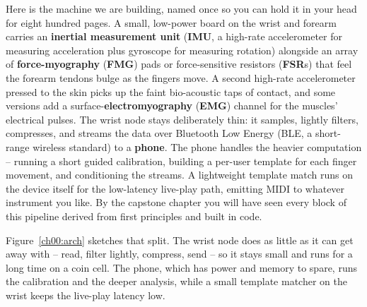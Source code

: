 \begin{goalbox}
Here is the machine we are building, named once so you can hold it in your head for eight
hundred pages. A small, low-power board on the wrist and forearm carries an \textbf{inertial measurement unit} (\textbf{IMU}, a
high-rate accelerometer for measuring acceleration plus gyroscope for measuring rotation) alongside an array of \textbf{force-myography} (\textbf{FMG}) pads or
force-sensitive resistors (\textbf{FSR}s) that feel the forearm tendons bulge as the fingers move. A
second high-rate accelerometer pressed to the skin picks up the faint bio-acoustic taps of
contact, and some versions add a surface-\textbf{electromyography} (\textbf{EMG}) channel for the muscles' electrical pulses.
The wrist node stays deliberately thin: it samples, lightly filters, compresses, and streams
the data over Bluetooth Low Energy (BLE, a short-range wireless standard) to a \textbf{phone}. The phone handles the heavier computation -- running a
short guided calibration, building a per-user template for each finger movement, and
conditioning the streams. A lightweight template match runs on the device itself for the
low-latency live-play path, emitting MIDI to whatever instrument you like. By the capstone
chapter you will have seen every block of this pipeline derived from first principles and
built in code.
\end{goalbox}

Figure~\ref{ch00:arch} sketches that split. The wrist node does as little as it can get away
with -- read, filter lightly, compress, send -- so it stays small and runs for a long time on
a coin cell. The phone, which has power and memory to spare, runs the calibration and the
deeper analysis, while a small template matcher on the wrist keeps the live-play latency low.

